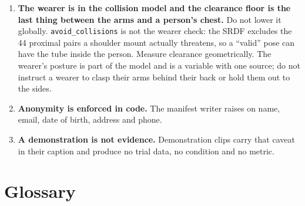 \documentclass[11pt,a4paper,oneside]{report}
\newcommand{\code}[1]{\texttt{\small #1}}
\begin{document}
\begin{enumerate}
      it reads unbound variables and dies otherwise.
\item \textbf{The wearer is in the collision model and the clearance floor is
      the last thing between the arms and a person's chest.} Do not lower it
      globally. \code{avoid\_collisions} is not the wearer check: the SRDF
      excludes the 44 proximal pairs a shoulder mount actually threatens, so a
      ``valid'' pose can have the tube inside the person. Measure clearance
      geometrically. The wearer's posture is part of the model and is a
      variable with one source; do not instruct a wearer to clasp their arms
      behind their back or hold them out to the sides.
\item \textbf{Anonymity is enforced in code.} The manifest writer raises on
      name, email, date of birth, address and phone.
\item \textbf{A demonstration is not evidence.} Demonstration clips carry that
      caveat in their caption and produce no trial data, no condition and no
      metric.
\end{enumerate}

\chapter{Glossary}
\end{document}
